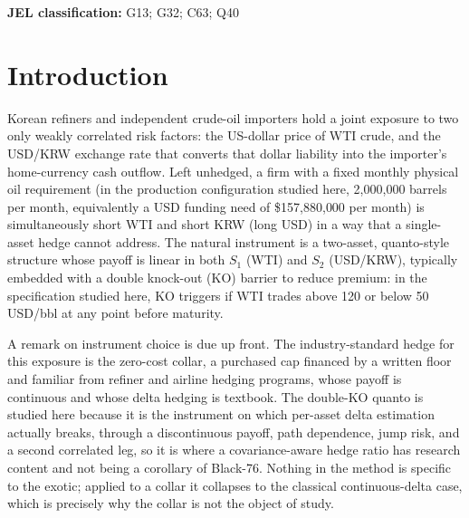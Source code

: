 \documentclass[11pt,a4paper]{article}
\begin{document}
\vspace{0.3em}
\noindent\textbf{JEL classification:} G13; G32; C63; Q40

\tableofcontents
\newpage

\section{Introduction}
\label{sec:intro}

Korean refiners and independent crude-oil importers hold a joint exposure to two only weakly correlated risk factors: the US-dollar price of WTI crude, and the USD/KRW exchange rate that converts that dollar liability into the importer's home-currency cash outflow. Left unhedged, a firm with a fixed monthly physical oil requirement (in the production configuration studied here, 2{,}000{,}000 barrels per month, equivalently a USD funding need of \$157{,}880{,}000 per month) is simultaneously short WTI and short KRW (long USD) in a way that a single-asset hedge cannot address. The natural instrument is a two-asset, quanto-style structure whose payoff is linear in both $S_1$ (WTI) and $S_2$ (USD/KRW), typically embedded with a double knock-out (KO) barrier to reduce premium: in the specification studied here, KO triggers if WTI trades above 120 or below 50 USD/bbl at any point before maturity.

A remark on instrument choice is due up front. The industry-standard hedge for this exposure is the zero-cost collar, a purchased cap financed by a written floor and familiar from refiner and airline hedging programs, whose payoff is continuous and whose delta hedging is textbook. The double-KO quanto is studied here because it is the instrument on which per-asset delta estimation actually breaks, through a discontinuous payoff, path dependence, jump risk, and a second correlated leg, so it is where a covariance-aware hedge ratio has research content and not being a corollary of Black-76. Nothing in the method is specific to the exotic; applied to a collar it collapses to the classical continuous-delta case, which is precisely why the collar is not the object of study.
\end{document}
